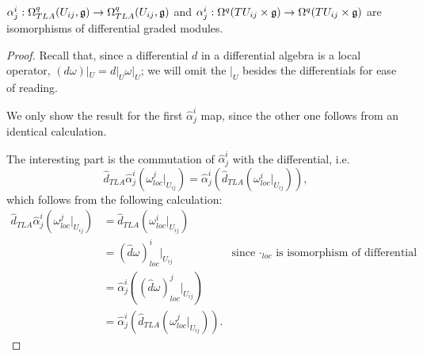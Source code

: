 \begin{theorem}
$\alpha^i_j: \Omega^q_{TLA}(U_{ij}, \mathfrak{g}) \to \Omega^q_{TLA}(U_{ij}, \mathfrak{g})$ and $\alpha^i_j: \Omega^q(TU_{ij}\times \mathfrak{g}) \to \Omega^q(TU_{ij}\times \mathfrak{g})$ are isomorphisms of differential graded modules.
\end{theorem}
\begin{proof}
Recall that, since a differential $d$ in a differential algebra is a local operator, $(d\omega)|_U = d|_U \omega|_U$; we will omit the $|_U$ besides the differentials for ease of reading.

We only show the result for the first $\hat \alpha^i_j$ map, since the other one follows from an identical calculation.

The interesting part is the commutation of $\hat \alpha^i_j$ with the differential, i.e.
\begin{equation*}
    \hat d_{TLA} \hat \alpha^i_j(\omega^j_{loc}|_{U_{ij}}) = \hat \alpha^i_j(\hat d_{TLA} (\omega^i_{loc}|_{U_{ij}})),
\end{equation*} which follows from the following calculation:
\begin{align*}
    \hat d_{TLA} \hat \alpha^i_j(\omega^j_{loc}|_{U_{ij}})
    &= \hat d_{TLA} (\omega^i_{loc}|_{U_{ij}}) \\
    &= (\hat d \omega)^i_{loc}|_{U_{ij}} & \text{since $\cdot_{loc}$ is isomorphism of differential algebras}\\
    &= \hat \alpha^i_j((\hat d \omega)^j_{loc}|_{U_{ij}}) \\
    &= \hat \alpha^i_j(\hat d_{TLA} (\omega^j_{loc}|_{U_{ij}})).
\end{align*}
\end{proof}
\linea 

